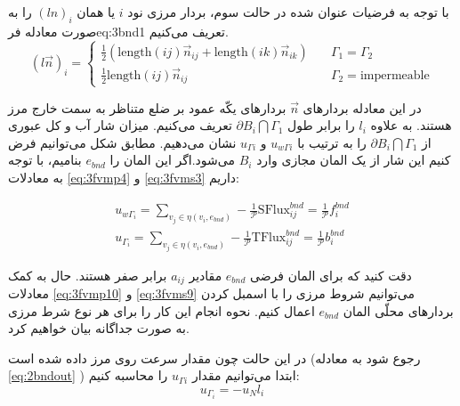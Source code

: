 با توجه به فرضیات عنوان شده در حالت سوم، بردار مرزی نود $i$ یا همان $(ln)_i$ را به صورت معادله ‌فر{eq:3bnd1} تعریف می‌کنیم.
\begin{equation}
\label{eq:3bnd1}
(l\vec n)_i = \begin{cases}
\frac{1}{2} \left( \text{length}(ij)\vec n_{ij} + \text{length}(ik)\vec n_{ik} \right) \quad &\Gamma_1 = \Gamma_2 \\
\frac{1}{2} \text{length}(ij)\vec n_{ij} \quad &\Gamma_2 = \text{impermeable} 
\end{cases}
\end{equation}

در این معادله بردار‌های $\vec n$ بردارهای یکّه عمود بر ضلع متناظر به سمت خارج مرز هستند. به علاوه $l_i$ را برابر طول $\partial B_i \bigcap \Gamma_1$ تعریف می‌کنیم. میزان شار آب و کل عبوری از 
$\partial B_i \bigcap \Gamma_1$  را به ترتیب با $u_{w\Gamma i}$ و $u_{\Gamma i}$
نشان می‌دهیم. مطابق شکل   می‌توانیم فرض کنیم این شار از یک المان مجازی وارد $B_i$ می‌شود.اگر این المان را $e_{bnd}$ بنامیم، با توجه به معادلات \eqref{eq:3fvmp4} و \eqref{eq:3fvms3} داریم:

\begin{equation}
\label{eq:3bnd2}
\begin{aligned}
u_{w\Gamma_i}= \sum_{v_j \in \eta(v_i,e_{bnd})} -\frac{1}{\mathcal P}\text{SFlux}_{ij}^{bnd} = 
\frac{1}{\mathcal P}f_i^{bnd} \\
u_{\Gamma_i} = \sum_{v_j \in \eta(v_i,e_{bnd})} -\frac{1}{\mathcal P}\text{TFlux}_{ij}^{bnd} = 
\frac{1}{\mathcal P}b_i^{bnd}
\end{aligned}
\end{equation}

دقت کنید که برای المان فرضی $e_{bnd}$ مقادیر $a_{ij}$ برابر صفر هستند. حال به کمک معادلات \eqref{eq:3fvmp10} و \eqref{eq:3fvms9} می‌توانیم شروط مرزی را با اسمبل کردن بردار‌های محلّی المان‌ $e_{bnd}$ اعمال کنیم. نحوه انجام این کار را برای هر نوع شرط مرزی به صورت جداگانه بیان خواهیم کرد.

در این حالت چون مقدار سرعت روی مرز داده شده است (رجوع شود به معادله  \eqref{eq:2bndout} ) ابتدا می‌توانیم مقدار $u_{\Gamma i}$ را محاسبه کنیم:
\begin{equation}
\label{eq:3bnd3}
u_{\Gamma_i}= -u_N l_i
\end{equation}

